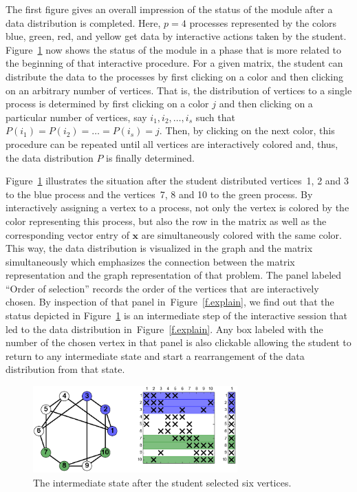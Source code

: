 \documentclass[12pt, twoside,a4paper,toc=bibliography]{scrbook}
\newcommand{\vek}[1]{{\ensuremath{\mathbf #1}}}
\newcommand{\figref}[1]{Figure~\protect\ref{#1}}
\begin{document}
The first figure gives an overall impression of the status of the module after a data
distribution is completed. Here, $p=4$ processes represented by the colors blue, green,
red, and yellow get data by interactive actions taken by the student.
Figure~\ref{f.beginning} now shows the status of the module in a phase that is more
related to the beginning of that interactive procedure. For a given matrix, the student
can distribute the data to the processes by first clicking on a color and then clicking
on an arbitrary number of vertices. That is, the distribution of vertices to a single
process is determined by first clicking on a color $j$ and then clicking on a particular
number of vertices, say $i_1, i_2, \dots, i_s$ such that $P(i_1) = P(i_2) = \dots =
P(i_s) = j$. Then, by clicking on the next color, this procedure can be repeated until
all vertices are interactively colored and, thus, the data distribution $P$ is finally
determined.

Figure~\ref{f.beginning} illustrates the situation after the student distributed
vertices~1, 2 and 3 to the blue process and the vertices~7, 8 and 10 to the green
process. By interactively assigning a vertex to a process, not only the vertex is colored
by the color representing this process, but also the row in the matrix as well as the
corresponding vector entry of \vek{x} are simultaneously colored with the same color.
This way, the data distribution is visualized in the graph and the matrix
simultaneously which emphasizes the connection between the matrix representation and the
graph representation of that problem. The panel labeled ``Order of selection'' records
the order of the vertices that are interactively chosen. By inspection of that panel
in~\figref{f.explain}, we find out that the status depicted in \figref{f.beginning} is an
intermediate step of the interactive session that led to the data distribution
in~\figref{f.explain}. Any box labeled with the number of the chosen vertex in that panel
is also clickable allowing the student to return to any intermediate state and start a
rearrangement of the data distribution from that state.


\begin{figure}
\centering
\includegraphics[width=0.7\textwidth]{twoColors}
\caption{The intermediate state after the student selected six vertices.}
\label{f.beginning}
\end{figure}
\end{document}
